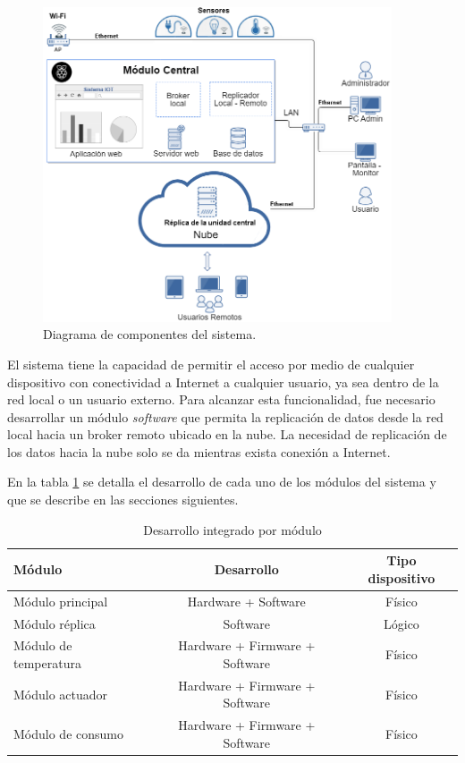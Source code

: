 \begin{figure}[htbp]
	\centering
	\includegraphics[width=0.92\textwidth]{./Figures/diagrama1.png}
	\caption{Diagrama de componentes del sistema.}

	\label{fig:diagrama1}
\end{figure}

El sistema tiene la capacidad de permitir el acceso por medio de cualquier dispositivo con conectividad a Internet a cualquier usuario, ya sea dentro de la red local o un usuario externo. Para alcanzar esta funcionalidad, fue necesario desarrollar un módulo \emph{software} que permita la replicación de datos desde la red local hacia un broker remoto ubicado en la nube. La necesidad de replicación de los datos hacia la nube solo se da mientras exista conexión a Internet. 





En la tabla \ref{tab:tablamodulos} se detalla el desarrollo de cada uno de los módulos del sistema y que se describe en las secciones siguientes.

\begin{table}[h]
	\centering
	\caption[Desarrollo integrado por módulo]{Desarrollo integrado por módulo}
	\begin{tabular}{l c c }    
		\toprule
		\textbf{Módulo} 	 & \textbf{Desarrollo}  & \textbf{Tipo dispositivo}\\
		\midrule
		Módulo principal & Hardware + Software & Físico\\		
		Módulo réplica & Software & Lógico \\
		Módulo de temperatura & Hardware + Firmware + Software & Físico\\		
		Módulo actuador & Hardware + Firmware + Software & Físico\\		
		Módulo de consumo	 & Hardware + Firmware + Software & Físico\\
		
		\bottomrule
		\hline
	\end{tabular}
	\label{tab:tablamodulos}
\end{table}


